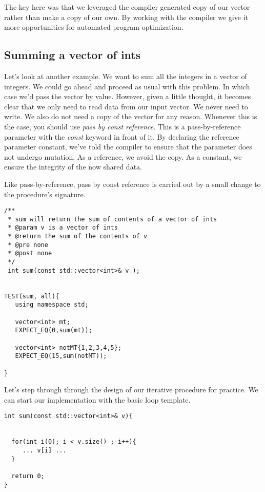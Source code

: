 \documentclass[]{tufte-handout}
\begin{document}
The key here was that we leveraged the compiler generated copy of our vector rather than make a copy of our own. By working with the compiler we give it more opportunities for automated program optimization.  

\subsection{Summing a vector of ints}

Let's look at another example. We want to sum all the integers in a vector of integers. We could go ahead and proceed as usual with this problem. In which case we'd pass the vector by value. However, given a little thought, it becomes clear that we only need to read data from our input vector. We never need to write.  We also do not need a copy of the vector for any reason. Whenever this is the case, you should use \textit{pass by const reference}.  This is a pass-by-reference parameter with the \textit{const} keyword in front of it. By declaring the reference parameter constant, we've told the compiler to ensure that the parameter does not undergo mutation. As a reference, we avoid the copy. As a constant, we ensure the integrity of the now shared data. 

Like pass-by-reference, pass by const reference is carried out by a small change to the procedure's signature. 
\begin{verbatim}
/**
 * sum will return the sum of contents of a vector of ints
 * @param v is a vector of ints
 * @return the sum of the contents of v
 * @pre none
 * @post none
 */
 int sum(const std::vector<int>& v );


TEST(sum, all){
   using namespace std;  
   
   vector<int> mt;
   EXPECT_EQ(0,sum(mt));
   
   vector<int> notMT{1,2,3,4,5};
   EXPECT_EQ(15,sum(notMT));

}

\end{verbatim}

Let's step through through the design of our iterative procedure for practice. We can start our implementation with the basic loop template.
\begin{verbatim}
int sum(const std::vector<int>& v){


  for(int i(0); i < v.size() ; i++){
     ... v[i] ... 
  }
 
  return 0;	
}
\end{verbatim}
\end{document}
